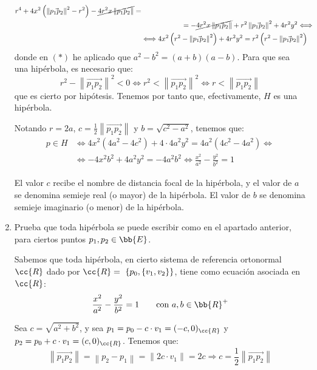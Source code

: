 \begin{ejercicio}
\begin{enumerate}
\begin{align*}
        r^4 + 4x^2\left(\left\|\vec{p_1p_2}\right\|^2-r^2\right) -\cancel{4r^2x\left\|\vec{p_1p_2}\right\|} =\\&\hspace{2cm}= - \cancel{4r^2x\left\|\vec{p_1p_2}\right\|} +r^2\left\|\vec{p_1p_2}\right\|^2 + 4r^2y^2 \Longleftrightarrow \\ & \Longleftrightarrow
        4x^2\left(r^2 - \left\|\vec{p_1p_2}\right\|^2\right) + 4r^2y^2 = r^2\left(r^2 - \left\|\vec{p_1p_2}\right\|^2\right)
    \end{align*}
    donde en $(\ast)$ he aplicado que $a^2-b^2=(a+b)(a-b)$. Para que sea una hipérbola, es necesario que:
    \begin{equation*}
        r^2 - \left\|\vec{p_1p_2}\right\|^2 < 0 \Longleftrightarrow
        r^2 < \left\|\vec{p_1p_2}\right\|^2 \Longleftrightarrow
        r < \left\|\vec{p_1p_2}\right\|
    \end{equation*}
    que es cierto por hipótesis. Tenemos por tanto que, efectivamente, $H$ es una hipérbola.

    Notando $r=2a$, $c=\frac{1}{2}\left\|\vec{p_1p_2}\right\|$ y $b=\sqrt{c^2-a^2}$, tenemos que:
    \begin{align*}
        p\in H &\Longleftrightarrow 4x^2\left(4a^2 - 4c^2\right) + 4\cdot 4a^2y^2 = 4a^2(4c^2 - 4a^2) \Longleftrightarrow \\ & \Longleftrightarrow
        -4x^2b^2 + 4a^2y^2 = -4a^2b^2 \Longleftrightarrow
        \frac{x^2}{a^2} - \frac{y^2}{b^2} = 1
    \end{align*}

    El valor $c$ recibe el nombre de distancia focal de la hipérbola, y el valor de $a$ se denomina semieje real (o mayor) de la hipérbola.
    El valor de $b$ se denomina semieje imaginario (o menor) de la hipérbola.

    \item Prueba que toda hipérbola se puede escribir como en el apartado anterior, para ciertos puntos $p_1, p_2 \in \bb{E}$.
    
    Sabemos que toda hipérbola, en cierto sistema de referencia ortonormal $\cc{R}$ dado por $\cc{R}=~\{p_0, \{v_1, v_2\}\}$, tiene como ecuación asociada en $\cc{R}$:
    \begin{equation*}
        \frac{x^2}{a^2} - \frac{y^2}{b^2} = 1 \qquad \text{con } a,b\in \bb{R}^+
    \end{equation*}

    Sea $c=\sqrt{a^2+b^2}$, y sea $p_1 = p_0 - c\cdot v_1=(-c,0)_{\cc{R}}$ y $p_2 = p_0  +c\cdot v_1=(c,0)_{\cc{R}}$. Tenemos que:
    \begin{equation*}
        \left\|\vec{p_1p_2}\right\| = \left\|p_2 - p_1\right\| = \left\|2c\cdot v_1\right\|= 2c \Longrightarrow c = \frac{1}{2}\left\|\vec{p_1p_2}\right\|
    \end{equation*}


\end{enumerate}
\end{ejercicio}
